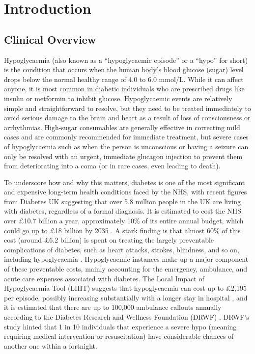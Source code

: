 \section{Introduction}

\begin{flushleft}
\end{flushleft}

\subsection{Clinical Overview}\label{sec:clinicalOverview}
\par{ \noindent Hypoglycaemia (also known as a “hypoglycaemic episode” or a “hypo” for short) is the condition that occurs when the human body’s blood glucose (sugar) level drops below the normal healthy range of 4.0 to 6.0 mmol/L. While it can affect anyone, it is most common in diabetic individuals who are prescribed drugs like insulin or metformin to inhibit glucose. Hypoglycaemic events are relatively simple and straightforward to resolve, but they need to be treated immediately to avoid serious damage to the brain and heart as a result of loss of consciousness or arrhythmias. High-sugar consumables are generally effective in correcting mild cases and are commonly recommended for immediate treatment, but severe cases of hypoglycaemia such as when the person is unconscious or having a seizure can only be resolved with an urgent, immediate glucagon injection to prevent them from deteriorating into a coma (or in rare cases, even leading to death). }


\vspace{10pt}
\par{\noindent To underscore how and why this matters, diabetes is one of the most significant and expensive long-term health conditions faced by the NHS, with recent figures from Diabetes UK suggesting that over 5.8 million people in the UK are living with diabetes, regardless of a formal diagnosis. It is estimated to cost the NHS over £10.7 billion a year, approximately 10\% of its entire annual budget, which could go up to £18 billion by 2035  \cite{diabetescosts}. A stark finding is that almost 60\% of this cost (around £6.2 billion) is spent on treating the largely preventable complications of diabetes, such as heart attacks, strokes, blindness, and so on, including hypoglycaemia  \cite{preventablediabetescosts}. Hypoglycaemic instances make up a major component of these preventable costs, mainly accounting for the emergency, ambulance, and acute care expenses associated with diabetes. The Local Impact of Hypoglycaemia Tool (LIHT) suggests that hypoglycaemia can cost up to £2,195 per episode, possibly increasing substantially with a longer stay in hospital  \cite{lihttool}, and it is estimated that there are up to 100,000 ambulance callouts annually according to the Diabetes Research and Wellness Foundation (DRWF)  \cite{diabetesemergencycallouts}. DRWF’s study hinted that 1 in 10 individuals that experience a severe hypo (meaning requiring medical intervention or resuscitation) have considerable chances of another one within a fortnight.}

